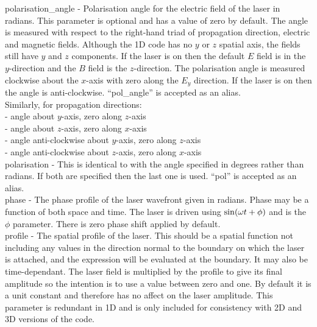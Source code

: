 {\emphtext polarisation\_angle} - Polarisation angle for the electric field of
  the laser in radians. This parameter is optional and has a value of zero by
  default. The angle is measured with respect to the right-hand triad of
  propagation direction, electric and magnetic fields. Although the 1D code
  has no $y$ or $z$ spatial axis, the fields still have $y$ and $z$ components.
  If the laser is on  then the default $E$ field is in the
  $y$-direction and the $B$ field is the $z$-direction. The polarisation angle
  is measured clockwise about the $x$-axis with zero along the $E_y$
  direction. If the laser is on  then the angle is
  anti-clockwise. ``pol\_angle'' is accepted as an alias.\\
  Similarly, for propagation directions:\\
 - angle about $y$-axis, zero along $z$-axis\\
 - angle about $z$-axis, zero along $x$-axis\\
 - angle anti-clockwise about $y$-axis, zero along $z$-axis\\
 - angle anti-clockwise about $z$-axis, zero along $x$-axis\\

{\emphtext polarisation} - This is identical to 
  with the angle specified in degrees rather than radians. If both are specified
  then the last one is used. ``pol'' is accepted as an alias.\\

{\emphtext phase} - The phase profile of the laser wavefront given in radians.
  Phase may be a function of both space and time. The laser is driven using
  ${\rm{sin}}(\omega t + \phi)$ and  is the $\phi$ parameter.
  There is zero phase shift applied by default.\\

{\emphtext profile} - The spatial profile of the laser. This should be a
  spatial function not including any values in the direction normal to the
  boundary on which the laser is attached, and the expression will be
  evaluated at the boundary. It may also be time-dependant.
  The laser field is multiplied by the profile to give
  its final amplitude so the intention is to use a value between zero and one.
  By default it is a unit constant and therefore has no affect on the laser
  amplitude. This parameter is redundant in 1D and is
  only included for consistency with 2D and 3D versions of the code.\\

